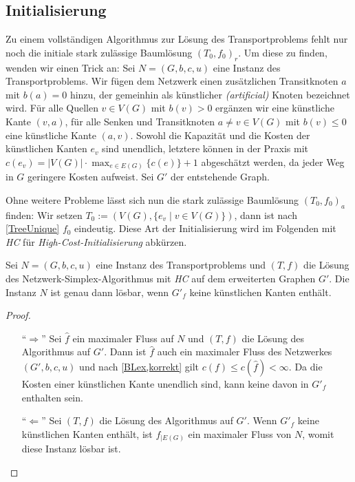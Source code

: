 \subsection{Initialisierung} \label{ch:init}
Zu einem vollständigen Algorithmus zur Lösung des Transportproblems fehlt nur noch die initiale stark zulässige Baumlösung $(T_0,f_0)_r$. Um diese zu finden, wenden wir einen Trick an: Sei $N=(G,b,c,u)$ eine Instanz des Transportproblems. Wir fügen dem Netzwerk einen zusätzlichen Transitknoten $a$ mit $b(a)=0$ hinzu, der gemeinhin als künstlicher \textit{(artificial)} Knoten bezeichnet wird. Für alle Quellen $v\in V(G)$ mit $b(v)>0$ ergänzen wir eine künstliche Kante $(v,a)$, für alle Senken und Transitknoten $a\neq v\in V(G)$ mit $b(v)\leq0$ eine künstliche Kante $(a,v)$. Sowohl die Kapazität und die Kosten der künstlichen Kanten $e_v$ sind unendlich, letztere können in der Praxis mit $c(e_v)=|V(G)|\cdot\max_{e\in E(G)}\{c(e)\}+1$ abgeschätzt werden, da jeder Weg in $G$ geringere Kosten aufweist. Sei $G'$ der entstehende Graph.

Ohne weitere Probleme lässt sich nun die stark zulässige Baumlösung $(T_0,f_0)_a$ finden: Wir setzen $T_0:=(V(G),\{e_v\mid v\in V(G)\})$, dann ist nach \cref{TreeUnique} $f_0$ eindeutig. Diese Art der Initialisierung wird im Folgenden mit \emph{HC} für \emph{High-Cost-Initialisierung} abkürzen.

\begin{lem}\label{Init}Sei $N=(G,b,c,u)$ eine Instanz des Transportproblems und $(T,f)$ die Lösung des Netzwerk-Simplex-Algorithmus mit \emph{HC} auf dem erweiterten Graphen $G'$. Die Instanz $N$ ist genau dann lösbar, wenn $G'_f$ keine künstlichen Kanten enthält.\end{lem}
\begin{proof}\label{solvable}\mbox{}
\begin{itemize}[topsep=0pt]
	\item[\enquote{$\Rightarrow$}] Sei $\hat{f}$ ein maximaler Fluss auf $N$ und $(T,f)$ die Lösung des Algorithmus auf $G'$. Dann ist $\hat{f}$ auch ein maximaler Fluss des Netzwerkes $(G',b,c,u)$ und nach \cref{BLex,korrekt} gilt $c(f)\leq c(\hat{f})<\infty$. Da die Kosten einer künstlichen Kante unendlich sind, kann keine davon in $G'_f$ enthalten sein.
	
	\item[\enquote{$\Leftarrow$}] Sei $(T,f)$ die Lösung des Algorithmus auf $G'$. Wenn $G'_f$ keine künstlichen Kanten enthält, ist $f_{|E(G)}$ ein maximaler Fluss von $N$, womit diese Instanz lösbar ist.\qedhere
\end{itemize}
\end{proof}

